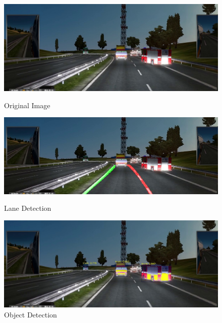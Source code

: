 \documentclass[runningheads]{llncs}
\begin{document}
\begin{figure}[!htb]
	\includegraphics[width=\linewidth]{result/w000139.jpg}
	\caption{Original Image}\label{fig:Original_Image}
	\endminipage\hfill
	\includegraphics[width=\linewidth]{result/w000139-lane.jpg}
	\caption{Lane Detection}\label{fig:Lane_Line_Result}
	\endminipage\hfill
	\includegraphics[width=\linewidth]{result/w000139-obj.jpg}
	\caption{Object Detection}\label{fig:Object_result}
	\endminipage
\end{figure}
\clearpage



\end{document}
